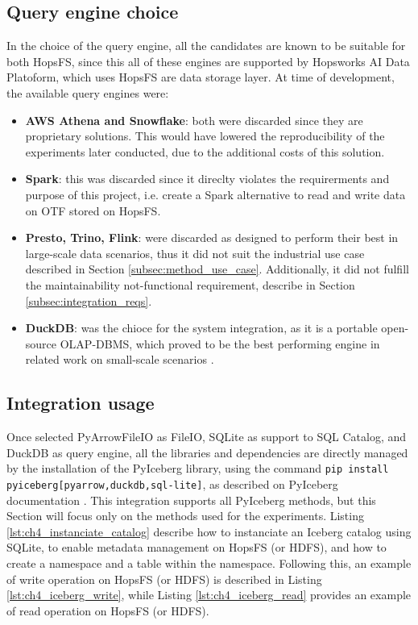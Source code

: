 \subsection{Query engine choice}
\label{subsec:integration_engine_choice}
In the choice of the query engine, all the candidates are known to be suitable for both \gls{HopsFS}, since this all of these engines are supported by Hopsworks AI Data Platoform, which uses HopsFS are data storage layer. At time of development, the available query engines were:
\begin{itemize}
    \item \textbf{\gls{AWS} Athena and Snowflake}: both were discarded since they are proprietary solutions. This would have lowered the reproducibility of the experiments later conducted, due to the additional costs of this solution.
    \item \textbf{Spark}: this was discarded since it direclty violates the requirerments and purpose of this project, i.e. create a Spark alternative to read and write data on \gls{OTF} stored on \gls{HopsFS}.
    \item \textbf{Presto, Trino, Flink}: were discarded as designed to perform their best in large-scale data scenarios, thus it did not suit the  industrial use case described in Section \ref{subsec:method_use_case}. Additionally, it did not fulfill the maintainability not-functional requirement, describe in Section \ref{subsec:integration_reqs}.
    \item \textbf{DuckDB}: was the chioce for the system integration, as it is a portable open-source \gls{OLAP}-\gls{DBMS}, which proved to be the best performing engine in related work on small-scale scenarios \cite{raasveldtDuckDBEmbeddableAnalytical2019,Khazanchi1801362}.
\end{itemize}


\subsection{Integration usage}
\label{subsec:integration_usage}
Once selected PyArrowFileIO as FileIO, SQLite as support to SQL Catalog, and DuckDB as query engine, all the libraries and dependencies are directly managed by the installation of the PyIceberg library, using the command \verb|pip install pyiceberg[pyarrow,duckdb,sql-lite]|, as described on PyIceberg documentation \cite{iceberg_tech_docs}. This integration supports all PyIceberg methods, but this Section will focus only on the methods used for the experiments. Listing \ref{lst:ch4_instanciate_catalog} describe how to instanciate an Iceberg catalog using SQLite, to enable metadata management on \gls{HopsFS} (or \gls{HDFS}), and how to create a namespace and a table within the namespace. Following this, an example of write operation on \gls{HopsFS} (or \gls{HDFS}) is described in Listing \ref{lst:ch4_iceberg_write}, while Listing \ref{lst:ch4_iceberg_read} provides an example of read operation on \gls{HopsFS} (or \gls{HDFS}).


